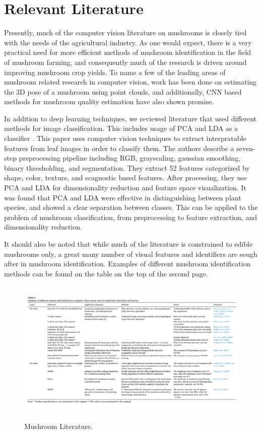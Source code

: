 \documentclass[journal]{IEEEtran}
\begin{document}
\section{Relevant Literature}
Presently, much of the computer vision literature on mushrooms is closely tied with the needs of the agricultural industry. As one would expect, there is a very practical need for more efficient methods of mushroom identification in the field of mushroom farming, and consequently much of the research is driven around improving mushroom crop yields. To name a few of the leading areas of mushroom related research in computer vision, work has been done on estimating the 3D pose of a mushroom using point clouds, and additionally, CNN based methods for mushroom quality estimation have also shown promise.
\par
In addition to deep learning techniques, we reviewed literature that used different methods for image classification. This includes usage of PCA and LDA as a classifier \cite{lakshika2021}. This paper uses computer vision techniques to extract interpratable features from leaf images in order to classify them. The authors describe a seven-step preprocessing pipeline including RGB, grayscaling, gaussian smoothing, binary thresholding, and segmentation. They extract 52 features categorized by shape, color, texture, and scagnostic based features. After processing, they use PCA and LDA for dimensionality reduction and feature space visualization. It was found that PCA and LDA were effective in distinguishing between plant species, and showed a clear separation between classes. This can be applied to the problem of mushroom classification, from preprocessing to feature extraction, and dimensionality reduction.
\par
It should also be noted that while much of the literature is constrained to edible mushrooms only, a great many number of visual features and identifiers are sough after in mushroom identification. Examples of different mushroom identification methods can be found on the table on the top of the second page.


\begin{figure}
    \centering
    \includegraphics[width=\textwidth,height=7cm]{imgs/mushroom_methods.PNG}
    \caption{Mushroom Literature. \cite{10.1016/j.compag.2022.107015}}
    \label{fig:Mushroom Literature}
\end{figure}
\end{document}

